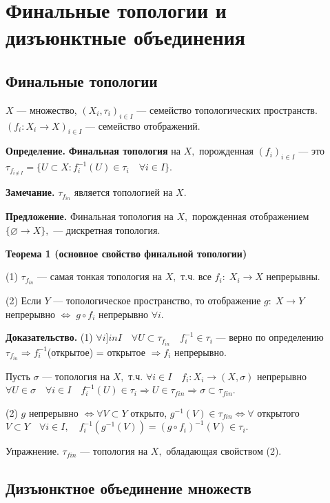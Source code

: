 \documentclass[12pt,a4paper]{article}
\begin{document}
\section{Финальные топологии и дизъюнктные объединения}

\subsection{Финальные топологии}

$X$ --- множество, $(X_{i}, \tau_{i})_{i \in I}$ --- семейство топологических пространств. $(f_{i}: X_{i} \to X)_{i \in I}$ --- семейство отображений.

\textbf{Определение.} \textbf{Финальная топология} на $X,$ порожденная $(f_{i})_{i \in I}$ --- это $\tau_{f_{i \not \in I}} = \{U \subset X: f_{i}^{-1}(U) \in \tau_{i} \quad \forall i \in I\}.$

\textbf{Замечание.} $\tau_{f_{in}}$ является топологией на $X.$

\textbf{Предложение.} Финальная топология на $X,$ порожденная отображением $\{\varnothing \to X\},$ --- дискретная топология. 

\textbf{Теорема 1 (основное свойство финальной топологии)}

(1) $\tau_{f_{in}}$ --- самая тонкая топология на $X,$ т.ч. все $f_{i}: \; X_{i} \to X$ непрерывны. 

(2) Если $Y$ --- топологическое пространство, то отображение $g: \; X \to Y$ непрерывно $\Leftrightarrow \; g \circ f_{i}$ непрерывно $\forall i.$ 

\textbf{Доказательство.} (1) $\forall i ]in I \quad \forall U \subset \tau_{f_{in}} \quad f_{i}^{-1} \in \tau_{i}$ --- верно по определению $\tau_{f_{in}} \Rightarrow f_{i}^{-1}$(открытое) = открытое $\Rightarrow f_{i}$ непрерывно. 

Пусть $\sigma$ --- топология на $X,$ т.ч. $\forall i \in I \quad f_{i}: X_{i} \to (X, \sigma)$ непрерывно $\forall U \in \sigma \quad \forall i \in I \quad f^{-1}_{i}(U) \in \tau_{i} \Rightarrow U \in \tau_{fin} \Rightarrow \sigma \subset \tau_{fin}.$ 

(2) $g$ непрерывно $\Leftrightarrow \forall V \subset Y$ открыто, $g^{-1}(V) \in \tau_{fin} \Leftrightarrow \forall$ открытого $V \subset Y \quad \forall i \in I, \quad f_{i}^{-1}(g^{-1}(V)) = (g \circ f_{i})^{-1}(V) \in \tau_{i}.$ 

Упражнение. $\tau_{fin}$ --- топология на $X,$ обладающая свойством (2).

\subsection{Дизъюнктное объединение множеств}
\end{document}

